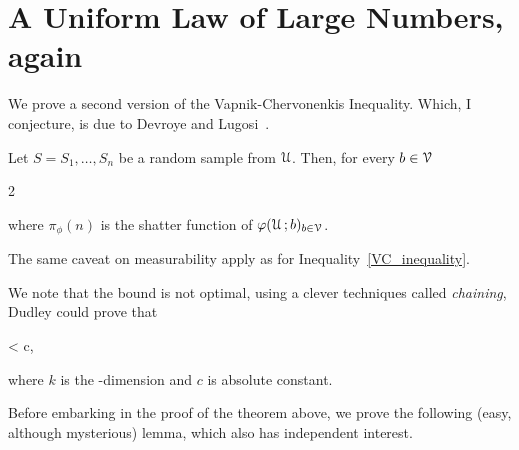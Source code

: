 \documentclass[scombinatorics.tex]{subfiles}
\begin{document}

\section{A Uniform Law of Large Numbers, again}\label{uniform2}

We prove a second version of the Vapnik-Chervonenkis Inequality.
Which, I conjecture, is due to Devroye and Lugosi~\cite{DL}.
 
\begin{void_thm}\label{DL_inequality}
  Let $S=S_1,\dots,S_n$ be a random sample from $\EuScript U$.
  Then, for every $b\in\EuScript V$

  {\le}
  {2}

  where $\pi_\phi(n)$ is the shatter function of $\varphi(\EuScript U\,;b)_{b\in\EuScript V}$.\QED
\end{void_thm}

The same caveat on measurability apply as for Inequality~\ref{VC_inequality}.

We note that the bound is not optimal, using a clever techniques called \textit{chaining}, Dudley could prove that

{<}
{c,}

where $k$ is the \vc-dimension and $c$ is absolute constant.

Before embarking in the proof of the theorem above, we prove the following (easy, although mysterious) lemma, which also has independent interest.
\end{document}
